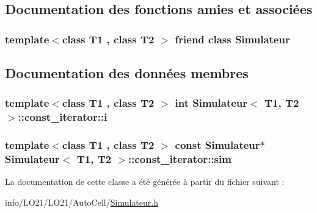 \subsection{Documentation des fonctions amies et associées}
\subsubsection[{\texorpdfstring{Simulateur}{Simulateur}}]{\setlength{\rightskip}{0pt plus 5cm}template$<$class T1 , class T2 $>$ friend class {\bf Simulateur}\hspace{0.3cm}{\ttfamily [friend]}}\hypertarget{class_simulateur_1_1const__iterator_ae6c3966e699bf920c86e0bd006bd8183}{}\label{class_simulateur_1_1const__iterator_ae6c3966e699bf920c86e0bd006bd8183}


\subsection{Documentation des données membres}
\subsubsection[{\texorpdfstring{i}{i}}]{\setlength{\rightskip}{0pt plus 5cm}template$<$class T1 , class T2 $>$ int {\bf Simulateur}$<$ T1, T2 $>$\+::const\+\_\+iterator\+::i\hspace{0.3cm}{\ttfamily [private]}}\hypertarget{class_simulateur_1_1const__iterator_aa4b2261e7087b7c68391c893aa531973}{}\label{class_simulateur_1_1const__iterator_aa4b2261e7087b7c68391c893aa531973}
\subsubsection[{\texorpdfstring{sim}{sim}}]{\setlength{\rightskip}{0pt plus 5cm}template$<$class T1 , class T2 $>$ const {\bf Simulateur}$\ast$ {\bf Simulateur}$<$ T1, T2 $>$\+::const\+\_\+iterator\+::sim\hspace{0.3cm}{\ttfamily [private]}}\hypertarget{class_simulateur_1_1const__iterator_af879bec3ae8b71f1c81826e0c1b24077}{}\label{class_simulateur_1_1const__iterator_af879bec3ae8b71f1c81826e0c1b24077}


La documentation de cette classe a été générée à partir du fichier suivant \+:\begin{DoxyCompactItemize}
\item 
info/\+L\+O21/\+L\+O21/\+Auto\+Cell/\hyperlink{_simulateur_8h}{Simulateur.\+h}\end{DoxyCompactItemize}
